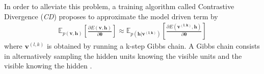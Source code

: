 \documentclass{article}
\begin{document}
In order to alleviate this problem, a training algorithm called Contrastive Divergence (\textit{CD}) \cite{hinton2002training} proposes to approximate the model driven term by
\begin{equation}
\label{eq:grad_log_like}
\begin{split}
\mathbb{E}_{p(\bm{v} , \bm{h})} \left[ \frac{\partial E(\bm{v},\bm{h})}{\partial \bm{\theta}} \right]
\approx 
\mathbb{E}_{p(\bm{h} | \bm{v^{(l,k)}})} \left[ \frac{\partial E(\bm{v^{(l,k)}},\bm{h})}{\partial \bm{\theta}} \right]
\end{split}
\end{equation}
where $\bm{v}^{(l,k)}$ is obtained by running a k-step Gibbs chain. A Gibbs chain consists in alternatively sampling the hidden units knowing the visible units  and the visible knowing the hidden .
\end{document}
